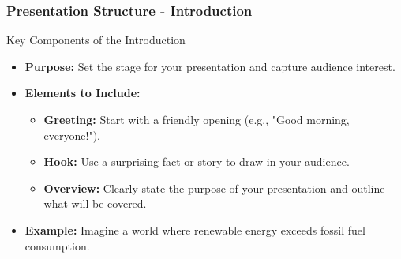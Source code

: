 \documentclass{beamer}
\begin{document}
\begin{frame}[fragile]
    \frametitle{Presentation Structure - Introduction}
    \begin{block}{Key Components of the Introduction}
        \begin{itemize}
            \item \textbf{Purpose:} Set the stage for your presentation and capture audience interest.
            \item \textbf{Elements to Include:}
            \begin{itemize}
                \item \textbf{Greeting:} Start with a friendly opening (e.g., "Good morning, everyone!").
                \item \textbf{Hook:} Use a surprising fact or story to draw in your audience.
                \item \textbf{Overview:} Clearly state the purpose of your presentation and outline what will be covered.
            \end{itemize}
            \item \textbf{Example:} Imagine a world where renewable energy exceeds fossil fuel consumption. 
        \end{itemize}
    \end{block}
\end{frame}
\end{document}
